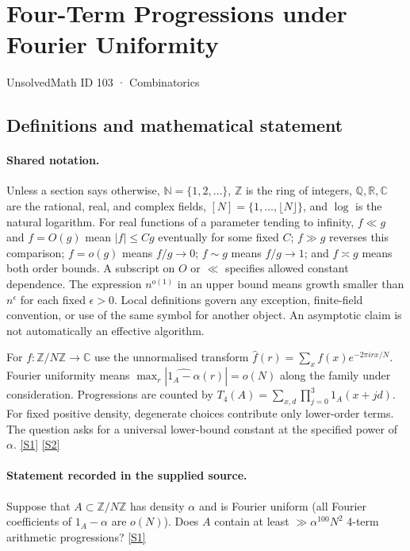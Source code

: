 \documentclass[11pt,a4paper]{article}
\newcommand{\N}{\mathbb{N}}
\newcommand{\Z}{\mathbb{Z}}
\newcommand{\Q}{\mathbb{Q}}
\newcommand{\R}{\mathbb{R}}
\newcommand{\C}{\mathbb{C}}
\newcommand{\sref}[2]{\hyperlink{source:#1:#2}{[S#2]}}
\begin{document}

\setcounter{section}{102}

\section{Four-Term Progressions under Fourier Uniformity}\label{103}

{\small\sffamily UnsolvedMath ID 103 · Combinatorics}

\subsection{Definitions and mathematical statement}

\paragraph{Shared notation.}Unless a section says otherwise, $\N=\{1,2,\ldots\}$,
$\Z$ is the ring of integers, $\Q,\R,\C$ are the rational, real, and complex
fields, $[N]=\{1,\ldots,\lfloor N\rfloor\}$, and $\log$ is the natural
logarithm. For real functions of a parameter tending to infinity,
$f\ll g$ and $f=O(g)$ mean $|f|\leq Cg$ eventually for some fixed $C$;
$f\gg g$ reverses this comparison; $f=o(g)$ means $f/g\to0$;
$f\sim g$ means $f/g\to1$; and $f\asymp g$ means both order bounds.
A subscript on $O$ or $\ll$ specifies allowed constant dependence.
The expression $n^{o(1)}$ in an upper bound means growth smaller than
$n^\epsilon$ for each fixed $\epsilon>0$. Local definitions govern any
exception, finite-field convention, or use of the same symbol for another
object. An asymptotic claim is not automatically an effective algorithm.



For $f:\Z/N\Z\to\C$ use the unnormalised transform $\widehat f(r)=\sum_x f(x)e^{-2\pi i rx/N}$. Fourier uniformity means $\max_r|\widehat{1_A-\alpha}(r)|=o(N)$ along the family under consideration. Progressions are counted by $T_4(A)=\sum_{x,d}\prod_{j=0}^3 1_A(x+jd)$. For fixed positive density, degenerate choices contribute only lower-order terms. The question asks for a universal lower-bound constant at the specified power of $\alpha$. \sref{103}{1} \sref{103}{2}

\paragraph{Statement recorded in the supplied source.}
Suppose that $A \subset \mathbb{Z}/N\mathbb{Z}$ has density $\alpha$ and is Fourier uniform (all Fourier coefficients of $1_A - \alpha$ are $o(N)$). Does $A$ contain at least $\gg \alpha^{100}N^2$ 4-term arithmetic progressions? \sref{103}{1}
\end{document}

